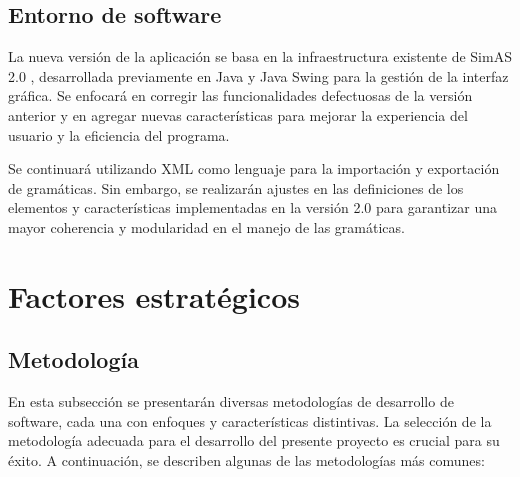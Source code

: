 \subsection{Entorno de software}

La nueva versión de la aplicación se basa en la infraestructura existente de SimAS 2.0 \cite{juan}, desarrollada previamente en Java \cite{java} y Java Swing \cite{javaswing} para la gestión de la interfaz gráfica. Se enfocará en corregir las funcionalidades defectuosas de la versión anterior y en agregar nuevas características para mejorar la experiencia del usuario y la eficiencia del programa.

Se continuará utilizando XML como lenguaje para la importación y exportación de gramáticas. Sin embargo, se realizarán ajustes en las definiciones de los elementos y características implementadas en la versión 2.0 para garantizar una mayor coherencia y modularidad en el manejo de las gramáticas.




\section{Factores estratégicos} \label{sec:estrategicos}

\subsection{Metodología}

En esta subsección se presentarán diversas metodologías de desarrollo de software, cada una con enfoques y características distintivas. La selección de la metodología adecuada para el desarrollo del presente proyecto es crucial para su éxito. A continuación, se describen algunas de las metodologías más comunes:


